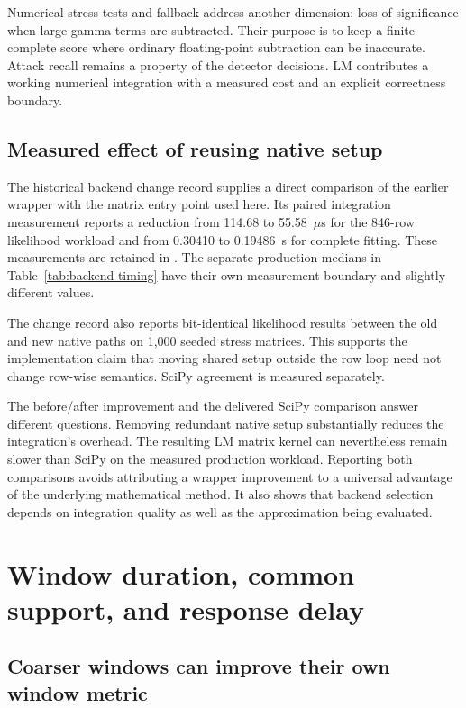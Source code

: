 Numerical stress tests and fallback address another dimension:
loss of significance when large gamma terms are subtracted. Their
purpose is to keep a finite complete score where ordinary
floating-point subtraction can be inaccurate. Attack recall remains a
property of the detector decisions. LM contributes a working numerical
integration with a measured cost and an explicit correctness boundary.

\subsection{Measured effect of reusing native setup}

The historical backend change record supplies a direct comparison
of the earlier wrapper with the matrix entry point used here.
Its paired integration measurement reports a reduction from
114.68 to 55.58~$\mu$s for the 846-row likelihood workload and
from 0.30410 to 0.19486~s for complete fitting. These measurements
are retained in . The
separate production medians in Table~\ref{tab:backend-timing}
have their own measurement boundary and slightly different values.

The change record also reports bit-identical likelihood results
between the old and new native paths on 1,000 seeded stress
matrices. This supports the implementation claim that moving
shared setup outside the row loop need not change row-wise
semantics. SciPy agreement is measured separately.

The before/after improvement and the delivered SciPy comparison
answer different questions. Removing redundant native setup
substantially reduces the integration's overhead. The resulting
LM matrix kernel can nevertheless remain slower than SciPy on
the measured production workload. Reporting both comparisons
avoids attributing a wrapper improvement to a universal advantage
of the underlying mathematical method. It also shows that
backend selection depends on integration quality as well as
the approximation being evaluated.

\section{Window duration, common support, and response delay}
\label{sec:duration-results}

\subsection{Coarser windows can improve their own window metric}

